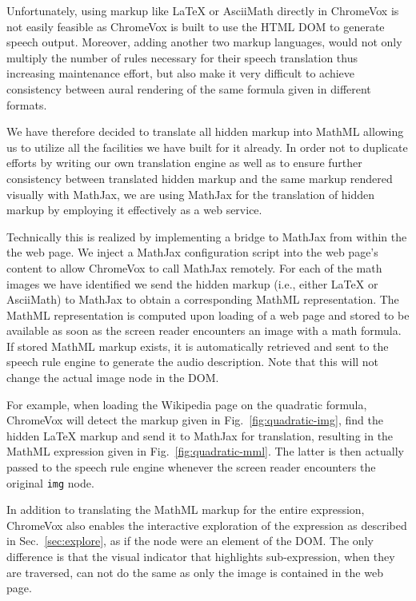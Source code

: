 \documentclass{sig-alternate}
\begin{document}
Unfortunately, using markup like {\LaTeX} or AsciiMath directly in ChromeVox is
not easily feasible as ChromeVox is built to use the HTML DOM to generate speech
output. Moreover, adding another two markup languages, would not only multiply
the number of rules necessary for their speech translation thus increasing
maintenance effort, but also make it very difficult to achieve consistency
between aural rendering of the same formula given in different formats.

We have therefore decided to translate all hidden markup into MathML allowing us
to utilize all the facilities we have built for it already. In order not to
duplicate efforts by writing our own translation engine as well as to ensure
further consistency between translated hidden markup and the same markup
rendered visually with MathJax, we are using MathJax for the translation of
hidden markup by employing it effectively as a web service.

Technically this is realized by implementing a bridge to MathJax from within the
the web page. We inject a MathJax configuration script into the web page's
content to allow ChromeVox to call MathJax remotely. For each of the math images
we have identified we send the hidden markup (i.e., either {\LaTeX} or
AsciiMath) to MathJax to obtain a corresponding MathML representation. The
MathML representation is computed upon loading of a web page and stored to be
available as soon as the screen reader encounters an image with a math
formula. If stored MathML markup exists, it is automatically retrieved and sent
to the speech rule engine to generate the audio description. Note that this will
not change the actual image node in the DOM.

For example, when loading the Wikipedia page on the quadratic formula, ChromeVox
will detect the markup given in Fig.~\ref{fig:quadratic-img}, find the hidden
{\LaTeX} markup and send it to MathJax for translation, resulting in the MathML
expression given in Fig.~\ref{fig:quadratic-mml}. The latter is then actually
passed to the speech rule engine whenever the screen reader encounters the
original \texttt{img} node.

In addition to translating the MathML markup for the entire expression,
ChromeVox also enables the interactive exploration of the expression as
described in Sec.~\ref{sec:explore}, as if the node were an element of the
DOM. The only difference is that the visual indicator that highlights
sub-expression, when they are traversed, can not do the same as only the image is
contained in the web page.
\end{document}

